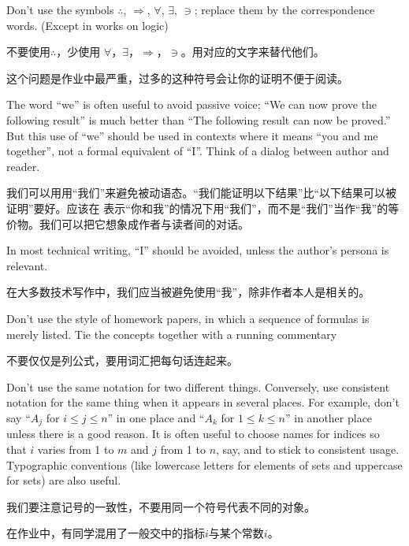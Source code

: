 \documentclass[presentation]{beamer}
\begin{document}
\begin{frame}[label={sec:org087f74c}]{3}
Don't use the symbols \(\therefore\), \(\Rightarrow\), \(\forall\), \(\exists\), \(\ni\); replace them by the
correspondence words. (Except in works on logic)

\vspace{5mm} 不要使用\(\therefore\)，少使用 \(\forall\)，\(\exists\)，\(\Rightarrow\)，\(\ni\)。用对应的文字来替代他们。

\vspace{5mm} 这个问题是作业中最严重，过多的这种符号会让你的证明不便于阅读。
\end{frame}
\begin{frame}[label={sec:orgcbd7823}]{6}
The word ``we'' is often useful to avoid passive voice; ``We can now prove the following result'' is
much better than ``The following result can now be proved.'' But this use of ``we'' should be used in
contexts where it means ``you and me together'', not a formal equivalent of ``I''. Think of a dialog
between author and reader.


\vspace{5mm}
我们可以用用“我们”来避免被动语态。“我们能证明以下结果”比“以下结果可以被证明”要好。应该在
表示“你和我”的情况下用``我们''，而不是“我们”当作“我”的等价物。我们可以把它想象成作者与读者间的对话。
\end{frame}


\begin{frame}[label={sec:orga54ca30}]{6}
\vspace{5mm}
In most technical writing, ``I'' should be avoided, unless the author’s persona is relevant.

\vspace{5mm}
在大多数技术写作中，我们应当被避免使用“我”，除非作者本人是相关的。
\end{frame}

\begin{frame}[label={sec:org28d8e65}]{10}
Don't use the style of homework papers, in which a sequence of formulas is merely listed. Tie
the concepts together with a running commentary

\vspace{5mm}不要仅仅是列公式，要用词汇把每句话连起来。
\end{frame}
\begin{frame}[label={sec:orgbd45c38}]{14}
Don't use the same notation for two different things. Conversely, use consistent notation for
the same thing when it appears in several places. For example, don't say ``\(A_j\)
for \(i\le j\le n\)'' in one place and ``\(A_k\) for \(1\le k\le n\)'' in another place unless there is a
good reason. It is often useful to choose names for indices so that \(i\) varies from 1 to \(m\)
and \(j\) from 1 to \(n\), say, and to stick to consistent usage. Typographic conventions (like
lowercase letters for elements of sets and uppercase for sets) are also useful.

\vspace{5mm}我们要注意记号的一致性，不要用同一个符号代表不同的对象。

\vspace{5mm}在作业中，有同学混用了一般交中的指标\(i\)与某个常数\(i\)。
\end{frame}
\end{document}
